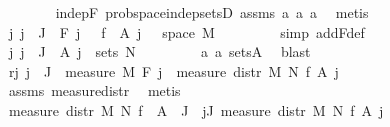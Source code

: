 \begin{isabellebody}
\ \ \ \ \ \ \isamarkupfalse%
\ indep{\isacharunderscore}{\kern0pt}F\ prob{\isacharunderscore}{\kern0pt}space{\isachardot}{\kern0pt}indep{\isacharunderscore}{\kern0pt}setsD\ assms{\isacharparenleft}{\kern0pt}{}{\isacharparenright}{\kern0pt}\ a{}\ a{}\ a{}\ \isamarkupfalse%
\ metis\isanewline
\isanewline
\ \ \ \ \isamarkupfalse%
\ {\isachardoublequoteopen}{\isasymAnd}j{\isachardot}{\kern0pt}\ j\ {\isasymin}\ J\ {\isasymLongrightarrow}\ F{\isacharprime}{\kern0pt}\ j\ {\isacharequal}{\kern0pt}\ \ f\ {\isacharminus}{\kern0pt}{\isacharbackquote}{\kern0pt}\ A{\isacharprime}{\kern0pt}\ j\ \ {\isasyminter}\ space\ M{\isachardoublequoteclose}\ \isanewline
\ \ \ \ \ \ \isamarkupfalse%
\ {\isacharparenleft}{\kern0pt}simp\ add{\isacharcolon}{\kern0pt}F{\isacharprime}{\kern0pt}{\isacharunderscore}{\kern0pt}def{\isacharparenright}{\kern0pt}\isanewline
\ \ \ \ \isamarkupfalse%
\ \isamarkupfalse%
\ {\isachardoublequoteopen}{\isasymAnd}j{\isachardot}{\kern0pt}\ j\ {\isasymin}\ J\ {\isasymLongrightarrow}\ A{\isacharprime}{\kern0pt}\ j\ {\isasymin}\ sets\ N{\isachardoublequoteclose}\ \isanewline
\ \ \ \ \ \ \isamarkupfalse%
\ a{}\ a{}\ sets{\isacharunderscore}{\kern0pt}A\ \isamarkupfalse%
\ blast\isanewline
\ \ \ \ \isamarkupfalse%
\ \isamarkupfalse%
\ r{}{\isacharcolon}{\kern0pt}{\isachardoublequoteopen}{\isasymAnd}j{\isachardot}{\kern0pt}\ j\ {\isasymin}\ J\ {\isasymLongrightarrow}\ measure\ M\ {\isacharparenleft}{\kern0pt}F{\isacharprime}{\kern0pt}\ j{\isacharparenright}{\kern0pt}\ {\isacharequal}{\kern0pt}\ measure\ {\isacharparenleft}{\kern0pt}distr\ M\ N\ f{\isacharparenright}{\kern0pt}\ {\isacharparenleft}{\kern0pt}A{\isacharprime}{\kern0pt}\ j{\isacharparenright}{\kern0pt}{\isachardoublequoteclose}\isanewline
\ \ \ \ \ \ \isamarkupfalse%
\ assms{\isacharparenleft}{\kern0pt}{}{\isacharparenright}{\kern0pt}\ measure{\isacharunderscore}{\kern0pt}distr\ \isamarkupfalse%
\ metis\isanewline
\isanewline
\ \ \ \ \isamarkupfalse%
\ {\isachardoublequoteopen}measure\ {\isacharparenleft}{\kern0pt}distr\ M\ N\ f{\isacharparenright}{\kern0pt}\ {\isacharparenleft}{\kern0pt}{\isasymInter}\ {\isacharparenleft}{\kern0pt}A{\isacharprime}{\kern0pt}\ {\isacharbackquote}{\kern0pt}\ J{\isacharparenright}{\kern0pt}{\isacharparenright}{\kern0pt}\ {\isacharequal}{\kern0pt}\ {\isacharparenleft}{\kern0pt}{\isasymProd}j{\isasymin}J{\isachardot}{\kern0pt}\ measure\ {\isacharparenleft}{\kern0pt}distr\ M\ N\ f{\isacharparenright}{\kern0pt}\ {\isacharparenleft}{\kern0pt}A{\isacharprime}{\kern0pt}\ j{\isacharparenright}{\kern0pt}{\isacharparenright}{\kern0pt}{\isachardoublequoteclose}\isanewline

\end{isabellebody}
